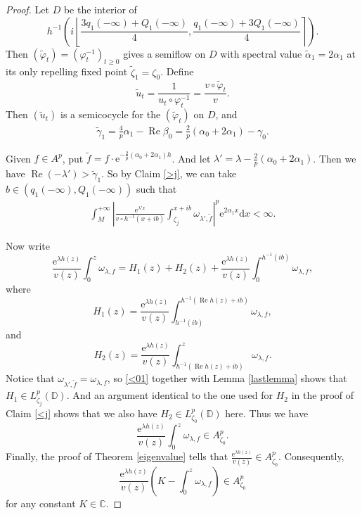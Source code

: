 \documentclass{amsart}
\theoremstyle{proclaim}
\theoremstyle{fancyproclaim}
\theoremstyle{definition}
\theoremstyle{fancystatement}
\numberwithin{equation}{section}
\begin{document}
\begin{proof}
Let $D$ be the interior of
$$h^{-1}\left(i\left\lfloor \frac{3q_1(-\infty)+Q_1(-\infty)}{4}, \frac{q_1(-\infty)+3Q_1(-\infty)}{4}\right\rceil\right).$$
Then $(\tilde{\varphi}_t)=(\varphi^{-1}_t)_{t\geq0}$ gives a semiflow on $D$ with spectral value $\tilde{\alpha}_1=2\alpha_1$ at its only repelling fixed point $\tilde{\zeta}_1=\zeta_0$. Define
$$\tilde{u}_t=\frac{1}{u_t\circ\varphi_t^{-1}}=\frac{v\circ\tilde{\varphi}_t}{v}.$$
Then $(\tilde{u}_t)$ is a semicocycle for the $(\tilde{\varphi}_t)$ on $D$, and 
\begin{align*}
\tilde{\gamma}_1=\frac{4}{p}\alpha_1-\operatorname{Re}\beta_0=\frac{2}{p}(\alpha_0+2\alpha_1)-\gamma_0.
\end{align*}

Given $f\in A^p$, put $ \tilde{f}=f \cdot\mathrm{e}^{-\frac{2}{p}(\alpha_0+2\alpha_1)h}$. And let $\lambda'=\lambda-\frac{2}{p}(\alpha_0+2\alpha_1)$. Then we have $\operatorname{Re}(-\lambda')>\tilde{\gamma}_1$. So by Claim \ref{>j}, we can take $b\in(q_1(-\infty),Q_1(-\infty))$ such that 
\begin{align}\label{<01}
\int_{M}^{+\infty}\left|\frac{ \mathrm{e}^{\lambda' x}}{v\circ h^{-1}(x+ib)}\int^{x+ib}_{\zeta_j}\omega_{\lambda',\tilde{f}}\right|^p \mathrm{e}^{2\alpha_1 x} \mathrm{d}x<\infty.
\end{align}

Now write 
$$\frac{ \mathrm{e}^{\lambda h(z)}}{v(z)}\int_0^z\omega_{\lambda,f}=H_1(z)+H_2(z)+\frac{ \mathrm{e}^{\lambda h(z)}}{v(z)}\int_0^{h^{-1}(ib)}\omega_{\lambda,f},$$
where
$$H_1(z)=\frac{ \mathrm{e}^{\lambda h(z)}}{v(z)}\int^{h^{-1}(\operatorname{Re}h(z)+ib)}_{h^{-1}(ib)}\omega_{\lambda,f},$$
and
$$H_2(z)=\frac{ \mathrm{e}^{\lambda h(z)}}{v(z)}\int^z_{h^{-1}(\operatorname{Re}h(z)+ib)}\omega_{\lambda,f}.$$
Notice that $\omega_{\lambda',\tilde{f}}=\omega_{\lambda,f}$, so \eqref{<01} together with Lemma \ref{lastlemma} shows that $H_1\in L^p_{\zeta_j}(\mathbb{D})$. And an argument identical to the one used for $H_2$ in the proof of Claim \ref{<j} shows that we also have $H_2\in L^p_{\zeta_0}(\mathbb{D})$ here. Thus we have
$$\frac{ \mathrm{e}^{\lambda h(z)}}{v(z)}\int_0^{z}\omega_{\lambda,f}\in A^p_{\zeta_0}.$$
Finally, the proof of Theorem \ref{eigenvalue} tells that $\frac{ \mathrm{e}^{\lambda h(z)}}{v(z)}\in A^p_{\zeta_0}.$ Consequently,
$$\frac{ \mathrm{e}^{\lambda h(z)}}{v(z)}\left(K-\int_0^{z}\omega_{\lambda,f}\right)\in A^p_{\zeta_0}$$
for any constant $K\in\mathbb{C}$. 
\end{proof}
\end{document}
